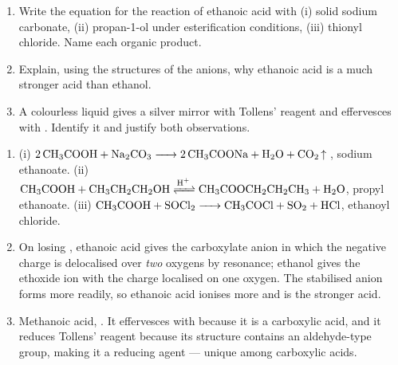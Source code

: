 \documentclass[11pt]{article}
\begin{document}
\begin{exercice}[Practice]
\begin{enumerate}
\item Write the equation for the reaction of ethanoic acid with (i) solid sodium carbonate, (ii) propan-1-ol under esterification conditions, (iii) thionyl chloride. Name each organic product.
\item Explain, using the structures of the anions, why ethanoic acid is a much stronger acid than ethanol.
\item A colourless liquid gives a silver mirror with Tollens' reagent and effervesces with . Identify it and justify both observations.
\end{enumerate}
\end{exercice}

\begin{corrige}[Exercise]
\begin{enumerate}
\item (i) $\ce{2CH3COOH + Na2CO3 -> 2CH3COONa + H2O + CO2 ^}$, sodium ethanoate. (ii) $\ce{CH3COOH + CH3CH2CH2OH <=>[H+] CH3COOCH2CH2CH3 + H2O}$, propyl ethanoate. (iii) $\ce{CH3COOH + SOCl2 -> CH3COCl + SO2 + HCl}$, ethanoyl chloride.
\item On losing , ethanoic acid gives the carboxylate anion  in which the negative charge is delocalised over \emph{two} oxygens by resonance; ethanol gives the ethoxide ion  with the charge localised on one oxygen. The stabilised anion forms more readily, so ethanoic acid ionises more and is the stronger acid.
\item Methanoic acid, . It effervesces with  because it is a carboxylic acid, and it reduces Tollens' reagent because its structure contains an aldehyde-type  group, making it a reducing agent --- unique among carboxylic acids.
\end{enumerate}
\end{corrige}
\end{document}
